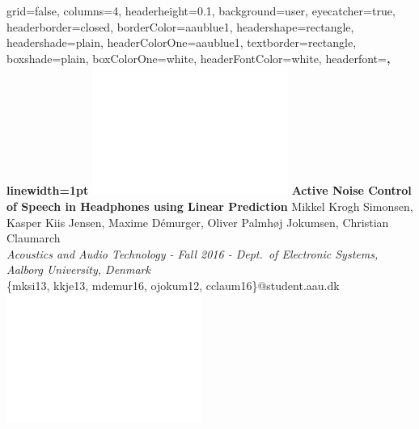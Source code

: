 \documentclass[a0paper,landscape,40pt]{baposter}
\begin{document}
\begin{poster}{
  grid=false,
  columns=4,
  headerheight=0.1\textheight,
  background=user,
  eyecatcher=true,
  headerborder=closed,
  borderColor=aaublue1,
  headershape=rectangle,
  headershade=plain,
  headerColorOne=aaublue1,
  textborder=rectangle,
  boxshade=plain,
  boxColorOne=white,
  headerFontColor=white,
  headerfont=\Large\sf\bf,
  linewidth=1pt
}
{
  \includegraphics[height=0.75\headerheight]{aau_logo_new_neg}
}
{\color{white}\bf
  Active Noise Control of Speech in Headphones using Linear Prediction
}
{\color{white}\small 
	\vspace{-3mm}Mikkel Krogh Simonsen, Kasper Kiis Jensen, Maxime Démurger, Oliver Palmhøj Jokumsen, Christian Claumarch\\
  \textit{Acoustics and Audio Technology - Fall 2016 - Dept.\ of Electronic Systems, Aalborg University, Denmark}\\
  \{mksi13, kkje13, mdemur16, ojokum12, cclaum16\}@student.aau.dk
}
{
  \includegraphics[height=0.75\headerheight]{aau_logo_new_neg}
}



\end{poster}
\end{document}
